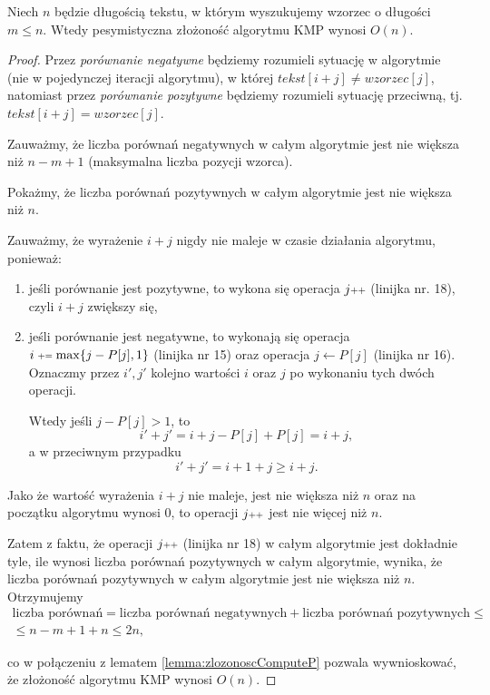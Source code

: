 \begin{theorem}
	Niech $n$ będzie długością tekstu, w którym wyszukujemy wzorzec o długości $m \leq n$. Wtedy pesymistyczna złożoność algorytmu KMP wynosi $O(n)$.
	\begin{proof}
		Przez \textit{porównanie negatywne} będziemy rozumieli sytuację w algorytmie
		(nie w pojedynczej iteracji algorytmu), w której
		$tekst[i + j] \not = wzorzec[j]$, natomiast przez \textit{porównanie pozytywne}
		będziemy rozumieli sytuację przeciwną, tj. $tekst[i + j] = wzorzec[j]$.
		
		Zauważmy, że liczba porównań negatywnych w całym algorytmie jest 
		nie większa niż $n - m + 1$
		(maksymalna liczba pozycji wzorca).
		
		Pokażmy, że liczba porównań pozytywnych w całym algorytmie jest nie większa niż $n$.
		
		Zauważmy, że wyrażenie $i + j$ nigdy nie maleje w czasie działania algorytmu, ponieważ:
		\begin{enumerate}
			\item jeśli porównanie jest pozytywne, to wykona się 
			operacja $j\pp$ (linijka nr. 18), czyli $i + j$ zwiększy się, 
			\item jeśli porównanie jest negatywne, to wykonają się 
			operacja $i \pleq \max\{j - P[j], 1\}$ (linijka nr 15) oraz
			operacja $j \gets P[j]$ (linijka nr 16). Oznaczmy przez $i', j'$ kolejno wartości $i$
			oraz $j$ po wykonaniu tych dwóch operacji.
			
			Wtedy jeśli $j - P[j] > 1$, to 
			\[ i' + j' = i + j - P[j] + P[j] = i + j,\]
			a w przeciwnym przypadku
			\[ i' + j' = i + 1 + j \geq i + j.\]
		\end{enumerate}
				
		Jako że wartość wyrażenia $i + j$ nie maleje, jest nie większa niż $n$ oraz
		na początku algorytmu wynosi 0, to operacji $j\pp$
		jest nie więcej niż $n$.
		
		Zatem z faktu, że operacji $j\pp$ (linijka nr 18) w całym algorytmie jest 
		dokładnie tyle, ile wynosi liczba porównań pozytywnych w całym algorytmie, wynika, że
		liczba porównań pozytywnych w całym algorytmie jest nie większa niż $n$. Otrzymujemy
		\begin{gather*}
			\text{liczba porównań} = \text{liczba porównań negatywnych} + \text{liczba porównań pozytywnych}\leq  \\
			\leq n - m + 1 + n \leq 2n,
		\end{gather*}
	
		co w połączeniu z lematem \ref{lemma:zlozonoscComputeP} pozwala wywnioskować, że
		złożoność algorytmu KMP wynosi $O(n)$. \qedhere
		
		
	\end{proof}	
\end{theorem}
